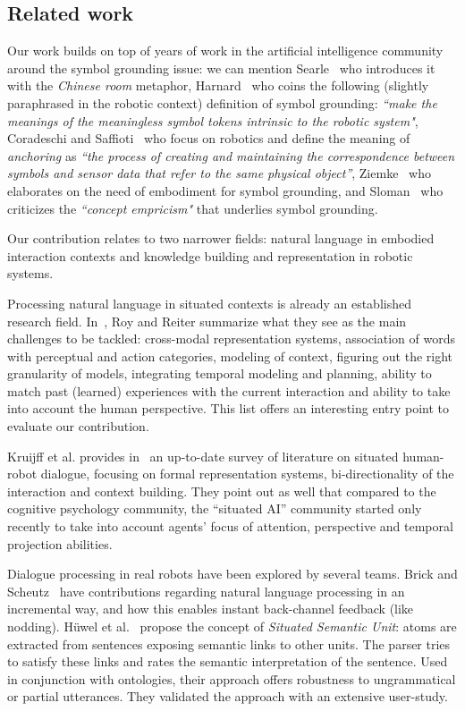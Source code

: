 \documentclass[twocolumn]{svjour3}
\begin{document}
\subsection{Related work}

Our work builds on top of years of work in the artificial intelligence
community around the symbol grounding issue: we can mention
Searle~\cite{Searle1980} who introduces it with the \emph{Chinese room}
metaphor, Harnard~\cite{Harnad1990} who coins the following (slightly
paraphrased in the robotic context) definition of symbol grounding:
\emph{``make the meanings of the meaningless symbol tokens intrinsic to the
robotic system"}, Coradeschi and Saffioti~\cite{Coradeschi2003} who focus on
robotics and define the meaning of \emph{anchoring} as \emph{``the process of
creating and maintaining the correspondence between symbols and sensor data
that refer to the same physical object''}, Ziemke~\cite{Ziemke1999} who
elaborates on the need of embodiment for symbol grounding, and
Sloman~\cite{Sloman2007} who criticizes the \emph{``concept empricism"} that
underlies symbol grounding.

Our contribution relates to two narrower fields: natural language in embodied
interaction contexts and knowledge building and representation in robotic
systems.

Processing natural language in situated contexts is already an established
research field. In~\cite{Roy2005}, Roy and Reiter summarize what they see as
the main challenges to be tackled: cross-modal representation systems,
association of words with perceptual and action categories, modeling of
context, figuring out the right granularity of models, integrating temporal
modeling and planning, ability to match past (learned) experiences with the
current interaction and ability to take into account the human perspective.
This list offers an interesting entry point to evaluate our contribution.

Kruijff et al. provides in~\cite{Kruijff2010} an up-to-date survey of
literature on situated human-robot dialogue, focusing on formal representation
systems, bi-directionality of the interaction and context building. They point
out as well that compared to the cognitive psychology community, the ``situated
AI'' community started only recently to take into account agents' focus of
attention, perspective and temporal projection abilities.

Dialogue processing in real robots have been explored by several teams.  Brick
and Scheutz~\cite{Brick2007} have contributions regarding natural language
processing in an incremental way, and how this enables instant back-channel
feedback (like nodding). Hüwel et al.~\cite{Huwel2006} propose the concept of
\textit{Situated Semantic Unit}: atoms are extracted from sentences exposing
semantic links to other units. The parser tries to satisfy these links and
rates the semantic interpretation of the sentence. Used in conjunction with
ontologies, their approach offers robustness to ungrammatical or partial
utterances. They validated the approach with an extensive user-study.
\end{document}
